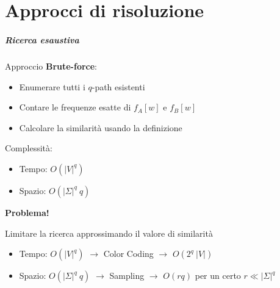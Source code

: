 \part{Approcci di risoluzione}

\begin{frame}
	\partpage
	\centering
\end{frame}

\begin{frame}
	\frametitle{Ricerca esaustiva}
	
	Approccio \textbf{Brute-force}:
	\begin{itemize}
		\item Enumerare tutti i $q$-path esistenti
		\item Contare le frequenze esatte di $f_A[w]$ e $f_B[w]$
		\item Calcolare la similarità usando la definizione
	\end{itemize}

	\pause
	\medskip
	
	Complessità:
	\begin{itemize}
		\item Tempo: $O(|V|^q)$
		\item Spazio: $O(|\Sigma|^q\ q)$
	\end{itemize}

	\pause
	\centering
	\medskip
	\textbf{Problema!}
	
	Limitare la ricerca approssimando il valore di similarità
	
	\pause
	
	\begin{itemize}
		\item Tempo: $O(|V|^q)$ $\rightarrow$ Color Coding $\rightarrow$ $O(2^q\ |V|)$
		\item Spazio: $O(|\Sigma|^q\ q)$ $\rightarrow$ Sampling $\rightarrow$ $O(rq)$ per un certo $r \ll |\Sigma|^q$
	\end{itemize}
	
	
		
\end{frame}

